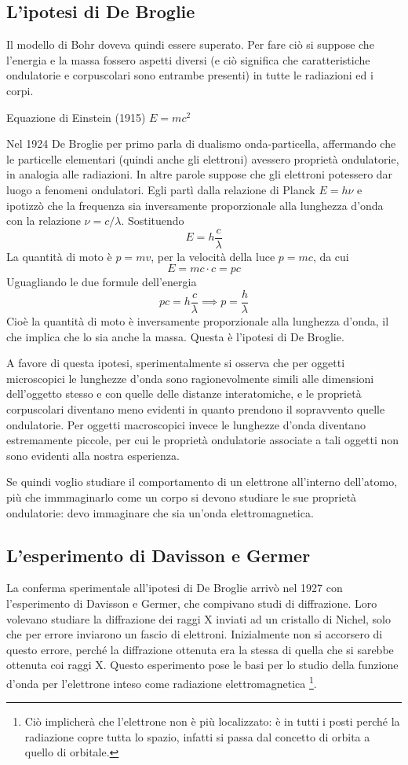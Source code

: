 \subsection{L'ipotesi di De Broglie}
Il modello di Bohr doveva quindi essere superato. Per fare ciò si suppose che l'energia e la massa fossero aspetti diversi (e ciò significa che caratteristiche ondulatorie e corpuscolari sono entrambe presenti) in tutte le radiazioni ed i corpi.

Equazione di Einstein (1915) $E=mc^2$

Nel 1924 De Broglie per primo parla di dualismo onda-particella, affermando che le particelle elementari (quindi anche gli elettroni) avessero proprietà ondulatorie, in analogia alle radiazioni. In altre parole suppose che gli elettroni potessero dar luogo a fenomeni ondulatori. Egli partì dalla relazione di Planck $E=h\nu$ e ipotizzò che la frequenza sia inversamente proporzionale alla lunghezza d'onda con la relazione $\nu=c/\lambda$. Sostituendo
$$E=h\frac{c}{\lambda}$$
La quantità di moto è $p=mv$, per la velocità della luce $p=mc$, da cui
$$E=mc \cdot c=pc$$
Uguagliando le due formule dell'energia
$$pc=h\frac{c}{\lambda} \implies p=\frac{h}{\lambda}$$
Cioè la quantità di moto è inversamente proporzionale alla lunghezza d'onda, il che implica che lo sia anche la massa. Questa è l'ipotesi di De Broglie.

A favore di questa ipotesi, sperimentalmente si osserva che per oggetti microscopici le lunghezze d'onda sono ragionevolmente simili alle dimensioni dell'oggetto stesso e con quelle delle distanze interatomiche, e le proprietà corpuscolari diventano meno evidenti in quanto prendono il sopravvento quelle ondulatorie. Per oggetti macroscopici invece le lunghezze d'onda diventano estremamente piccole, per cui le proprietà ondulatorie associate a tali oggetti non sono evidenti alla nostra esperienza.

Se quindi voglio studiare il comportamento di un elettrone all'interno dell'atomo, più che immmaginarlo come un corpo si devono studiare le sue proprietà ondulatorie: devo immaginare che sia un'onda elettromagnetica.
\subsection{L'esperimento di Davisson e Germer}
La conferma sperimentale all'ipotesi di De Broglie arrivò nel 1927 con l'esperimento di Davisson e Germer, che compivano studi di diffrazione. Loro volevano studiare la diffrazione dei raggi X inviati ad un cristallo di Nichel, solo che per errore inviarono un fascio di elettroni. Inizialmente non si accorsero di questo errore, perché la diffrazione ottenuta era la stessa di quella che si sarebbe ottenuta coi raggi X.
Questo esperimento pose le basi per lo studio della funzione d'onda per l'elettrone inteso come radiazione elettromagnetica \footnote{Ciò implicherà che l'elettrone non è più localizzato: è in tutti i posti perché la radiazione copre tutta lo spazio, infatti si passa dal concetto di orbita a quello di orbitale.}.

